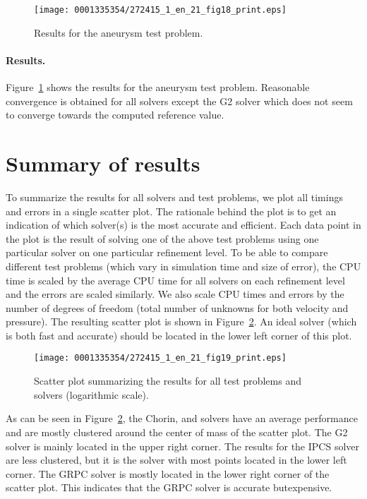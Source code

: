 \begin{figure}[!t]
\centering
\texttt{[image: 0001335354/272415\_1\_en\_21\_fig18\_print.eps]}
\caption{Results for the aneurysm test problem.}
\label{fig:aneurysm_res}\vspace*{6pt}
\end{figure}

\paragraph{Results.}

Figure~\ref{fig:aneurysm_res} shows the results for the aneurysm test
problem. Reasonable convergence is obtained for all solvers except the
G2 solver which does not seem to converge towards the computed
reference value.

\vspace*{6pt}
\section{Summary of results}

To summarize the results for all solvers and test problems, we plot
all timings and errors in a single scatter plot. The rationale behind
the plot is to get an indication of which solver(s) is the most
accurate and efficient. Each data point in the plot is the result of
solving one of the above test problems using one particular solver on
one particular refinement level. To be able to compare different test
problems (which vary in simulation time and size of error), the CPU
time is scaled by the average CPU time for all solvers on each
refinement level and the errors are scaled similarly. \pagebreak We also scale
CPU times and errors by the number of degrees of freedom (total number
of unknowns for both velocity and pressure). The resulting scatter
plot is shown in Figure~\ref{fig:scatter}. An ideal solver (which is
both fast and accurate) should be located in the lower left corner of
this plot.

\begin{figure}[!t]
\centering
\texttt{[image: 0001335354/272415\_1\_en\_21\_fig19\_print.eps]}
\caption{Scatter plot summarizing the results for all test problems
and solvers (logarithmic scale).}\label{fig:scatter}
\end{figure}

As can be seen in Figure~\ref{fig:scatter}, the Chorin,  and
 solvers have an average performance and are mostly clustered
around the center of mass of the scatter plot. The G2 solver is mainly
located in the upper right corner. The results for the IPCS solver are
less clustered, but it is the solver with most points located in the
lower left corner. The GRPC solver is mostly located in the lower
right corner of the scatter plot. This indicates that the GRPC solver
is accurate but\break expensive.

